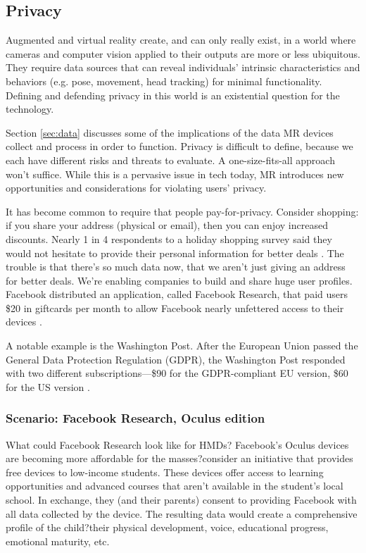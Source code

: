 

\subsection{Privacy}
Augmented and virtual reality create, and can only really exist, in a world where cameras and computer vision applied to their outputs are more or less ubiquitous. They require data sources that can reveal individuals' intrinsic characteristics and behaviors (e.g. pose, movement, head tracking) for minimal functionality. Defining and defending privacy in this world is an existential question for the technology.

Section \ref{sec:data} discusses some of the implications of the data MR devices collect and process in order to function. Privacy is difficult to define, because we each have different risks and threats to evaluate. A one-size-fits-all approach won't suffice. While this is a pervasive issue in tech today, MR introduces new opportunities and considerations for violating users' privacy.

It has become common to require that people pay-for-privacy. Consider shopping: if you share your address (physical or email), then you can enjoy increased discounts. Nearly 1 in 4 respondents to a holiday shopping survey said they would not hesitate to provide their personal information for better deals \cite{moses}. The trouble is that there's so much data now, that we aren't just giving an address for better deals. We're enabling companies to build and share huge user profiles. Facebook distributed an application, called Facebook Research, that paid users \$20 in giftcards per month to allow Facebook nearly unfettered access to their devices \cite{axon}.

A notable example is the Washington Post. After the European Union passed the General Data Protection Regulation (GDPR), the Washington Post responded with two different subscriptions---\$90 for the GDPR-compliant EU version, \$60 for the US version \cite{karl}.

\subsubsection{Scenario: Facebook Research, Oculus edition}

What could Facebook Research look like for HMDs? Facebook's Oculus devices are becoming more affordable for the masses?consider an initiative that provides free devices to low-income students. These devices offer access to learning opportunities and advanced courses that aren't available in the student's local school. In exchange, they (and their parents) consent to providing Facebook with all data collected by the device. The resulting data would create a comprehensive profile of the child?their physical development, voice, educational progress, emotional maturity, etc.

